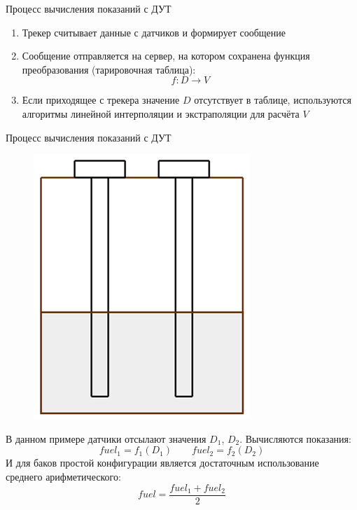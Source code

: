 \documentclass[usenames,dvipsnames,11pt]{beamer}
\begin{document}
\begin{frame}{Процесс вычисления показаний с ДУТ}
	\begin{enumerate}
		\item Трекер считывает данные с датчиков и формирует сообщение
		\item Сообщение отправляется на сервер, на котором сохранена функция преобразования (тарировочная таблица):
		$$f:D \rightarrow V$$
		\item Если приходящее с трекера значение $D$ отсутствует в таблице, используются алгоритмы линейной интерполяции и экстраполяции для расчёта $V$
	\end{enumerate}
\end{frame}

\begin{frame}{Процесс вычисления показаний с ДУТ}
	\begin{minipage}[h]{0.39\linewidth}
			\begin{figure}
			\centering
			\includegraphics[width=0.9\linewidth]{graphics/screenshot003}
			\end{figure}
		\end{minipage}
		\hfill
		\begin{minipage}[h]{0.59\linewidth}
			В данном примере датчики отсылают значения $D_1$, $D_2$. Вычисляются показания:
			$$fuel_1 = f_1(D_1) \qquad fuel_2 = f_2(D_2)$$
			И для баков простой конфигурации является достаточным использование среднего арифметического:
			$$fuel = \frac{fuel_1 + fuel_2}{2}$$ 	
		\end{minipage}
\end{frame}
\end{document}
